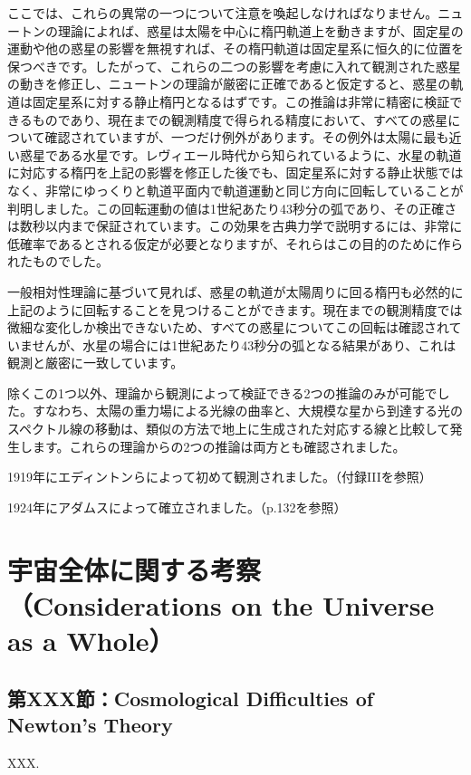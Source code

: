 \documentclass[a4paper,11pt,openany]{ltjsbook}
\begin{document}
ここでは、これらの異常の一つについて注意を喚起しなければなりません。ニュートンの理論によれば、惑星は太陽を中心に楕円軌道上を動きますが、固定星の運動や他の惑星の影響を無視すれば、その楕円軌道は固定星系に恒久的に位置を保つべきです。したがって、これらの二つの影響を考慮に入れて観測された惑星の動きを修正し、ニュートンの理論が厳密に正確であると仮定すると、惑星の軌道は固定星系に対する静止楕円となるはずです。この推論は非常に精密に検証できるものであり、現在までの観測精度で得られる精度において、すべての惑星について確認されていますが、一つだけ例外があります。その例外は太陽に最も近い惑星である水星です。レヴィエール時代から知られているように、水星の軌道に対応する楕円を上記の影響を修正した後でも、固定星系に対する静止状態ではなく、非常にゆっくりと軌道平面内で軌道運動と同じ方向に回転していることが判明しました。この回転運動の値は1世紀あたり43秒分の弧であり、その正確さは数秒以内まで保証されています。この効果を古典力学で説明するには、非常に低確率であるとされる仮定が必要となりますが、それらはこの目的のために作られたものでした。

一般相対性理論に基づいて見れば、惑星の軌道が太陽周りに回る楕円も必然的に上記のように回転することを見つけることができます。現在までの観測精度では微細な変化しか検出できないため、すべての惑星についてこの回転は確認されていませんが、水星の場合には1世紀あたり43秒分の弧となる結果があり、これは観測と厳密に一致しています。

除くこの1つ以外、理論から観測によって検証できる2つの推論のみが可能でした。すなわち、太陽の重力場による光線の曲率と、大規模な星から到達する光のスペクトル線の移動は、類似の方法で地上に生成された対応する線と比較して発生します。これらの理論からの2つの推論は両方とも確認されました。

 1919年にエディントンらによって初めて観測されました。（付録IIIを参照）

 1924年にアダムスによって確立されました。（p.132を参照）


\clearpage
\part{宇宙全体に関する考察（Considerations on the Universe as a Whole）}



\clearpage
\chapter{第XXX節：Cosmological Difficulties of Newton's Theory}

XXX.
\end{document}

